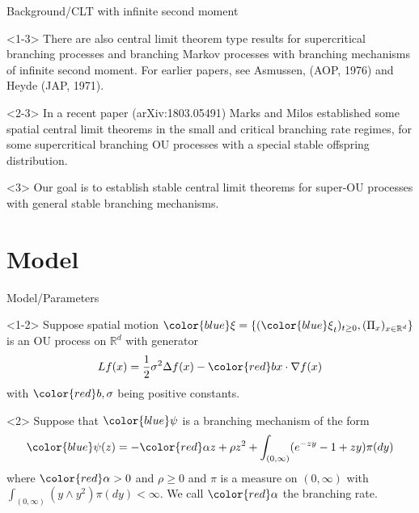 \documentclass[xcolor=dvipsnames]{beamer}
\begin{document}
\begin{frame}{Background/CLT with infinite second moment}
\begin{block}{}<1-3>
There are also {\color{Bittersweet}central limit theorem} type results for {\color{PineGreen} supercritical} {\color{blue}branching processes}
and {\color{blue} branching Markov processes} with branching mechanisms of {\color{PineGreen} infinite second moment}.
For earlier papers, see Asmussen, (AOP, 1976) and Heyde (JAP, 1971).
\end{block}
\begin{block}{}<2-3>
In a recent paper (arXiv:1803.05491) Marks and Milos established some {\color{Bittersweet}spatial central limit theorems} in the {\color{PineGreen} small and critical branching rate regimes}, for some {\color{PineGreen} supercritical} {\color{blue} branching OU processes} with a {\color{PineGreen} special stable offspring distribution.}
\end{block}
\begin{block}{}<3>
Our {\color{red}goal} is to establish {\color{Bittersweet}stable central limit theorems} for {\color{blue}super-OU processes} with {\color{PineGreen} general stable branching mechanisms.}
\end{block}  
\end{frame}

\section{Model}

\begin{frame}{Model/Parameters}
\begin{block}{}<1-2>
Suppose {\color{PineGreen} spatial motion} ${\color{blue}\xi}=\{({\color{blue}\xi}_t)_{t\ge 0}, (\Pi_x)_{x\in \mathbb R^d}\}$ is an {\color{PineGreen}OU process} on $\mathbb R^d$ with generator
$$
Lf(x)=\frac12\sigma^2\Delta f(x)-{\color{red} b}x\cdot \nabla f(x)
$$
with ${\color{red}b}, \sigma$ being positive constants.
\end{block}
\begin{block}{}<2>
Suppose that ${\color{blue}\psi}$ is a {\color{PineGreen}branching mechanism} of the form
$$
{\color{blue}\psi} (z)=-{\color{red}\alpha} z + \rho z^2 +\int_{(0, \infty)}(e^{-zy}-1+zy) \pi(dy)
$$
where ${\color{red}\alpha}>0$ and $\rho\ge 0$ and $\pi$ is a measure on $(0, \infty)$ with
$\int_{(0, \infty)}(y\wedge y^2)\pi(dy)<\infty$.
We call ${\color{red}\alpha}$ the {\color{PineGreen}branching rate}.
\end{block}
\end{frame}
\end{document}
